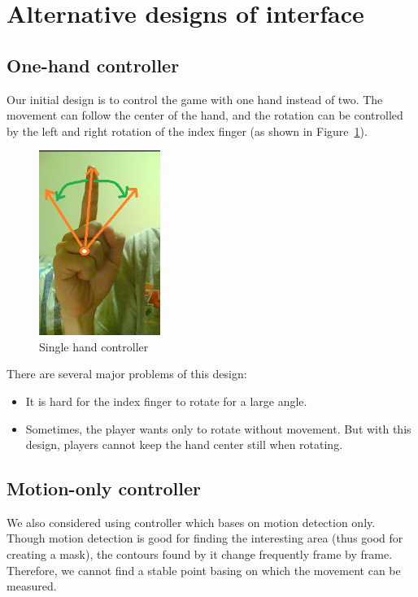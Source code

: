 \documentclass[10pt,twocolumn,letterpaper]{article}
\begin{document}
\section{Alternative designs of interface}
\subsection{One-hand controller}
Our initial design is to control the game with one hand instead of two. 
The movement can follow the center of the hand, and the rotation can be 
controlled by the left and right rotation of the index finger (as shown in 
Figure~\ref{fig:singlehand}).

\begin{figure}[h]
\centering
\includegraphics[height=6cm]{singlehand.png}
\caption{Single hand controller}
\label{fig:singlehand}
\end{figure}

There are several major problems of this design:
\begin{itemize}
	\item It is hard for the index finger to rotate for a large angle.
	\item Sometimes, the player wants only to rotate without movement. 
	But with this design, players cannot keep the hand center still when rotating. 
\end{itemize}

\subsection{Motion-only controller}
We also considered using controller which bases on motion detection only. 
Though motion detection is good for finding the interesting area (thus good 
for creating a mask), the contours found by it change frequently frame by frame. 
Therefore, we cannot find a stable point basing on which the movement can be measured.
\end{document}
